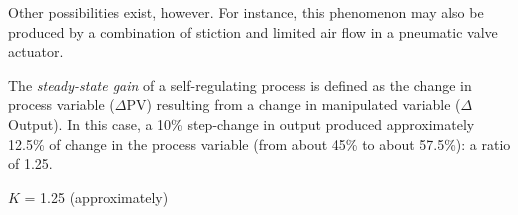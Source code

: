 Other possibilities exist, however.  For instance, this phenomenon may also be produced by a combination of stiction and limited air flow in a pneumatic valve actuator.

\vskip 10pt

The {\it steady-state gain} of a self-regulating process is defined as the change in process variable ($\Delta$PV) resulting from a change in manipulated variable ($\Delta$Output).  In this case, a 10\% step-change in output produced approximately 12.5\% of change in the process variable (from about 45\% to about 57.5\%): a ratio of 1.25.

\vskip 10pt

$K$ = 1.25 (approximately)











